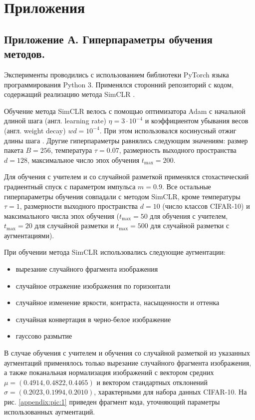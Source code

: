 \section*{Приложения}

\subsection*{Приложение А. Гиперпараметры обучения методов.} 
\label{appendix:1}

Эксперименты проводились с использованием библиотеки PyTorch \cite{pytorch} языка программирования Python 3. Применялся сторонний репозиторий с кодом, содержащий реализацию метода SimCLR \cite{simclrrepo}.

Обучение метода SimCLR велось с помощью оптимизатора Adam \cite{adam} с начальной длиной шага (англ. learning rate) $\eta=3\cdot 10^{-4}$ и коэффициентом убывания весов (англ. weight decay) $wd=10^{-4}$. При этом использовался косинусный отжиг длины шага \cite{cosine}. Другие гиперпараметры равнялись следующим значениям: размер пакета $B=256$, температура $\tau=0.07$, размерность выходного пространства $d=128$, максимальное число эпох обучения $t_{\max}=200$.

Для обучения с учителем и со случайной разметкой применялся стохастический градиентный спуск с параметром импульса $m=0.9$. Все остальные гиперпараметры обучения совпадали с методом SimCLR, кроме температуры $\tau=1$, размерности выходного пространства $d=10$ (число классов CIFAR-10) и максимального числа эпох обучения ($t_{\max}=50$ для обучения с учителем, $t_{\max}=20$ для случайной разметки и $t_{\max}=500$ для случайной разметки с аугментациями).

При обучении метода SimCLR использовались следующие аугментации:
\begin{itemize}
    \setlength\itemsep{-0.25em}
    \item вырезание случайного фрагмента изображения
    \item случайное отражение изображения по горизонтали
    \item случайное изменение яркости, контраста, насыщенности и оттенка
    \item случайная конвертация в черно-белое изображение
    \item гауссово размытие
\end{itemize}

\noindent
В случае обучения с учителем и обучения со случайной разметкой из указанных аугментаций применялось только вырезание случайного фрагмента изображения, а также поканальная нормализация изображений с вектором средних $\mu=(0.4914, 0.4822, 0.4465)$ и вектором стандартных отклонений $\sigma=(0.2023, 0.1994, 0.2010)$, характерными для набора данных CIFAR-10. На рис. \ref{appendix:pic:1} приведен фрагмент кода, уточняющий параметры использованных аугментаций.

